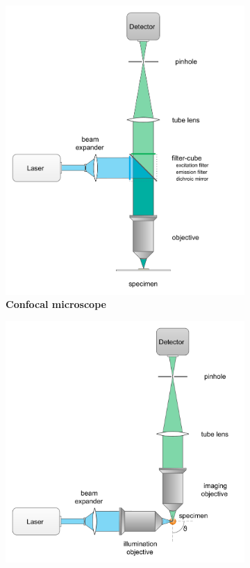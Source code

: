 \documentclass{tdk_style}
\begin{document}
\begin{figure}
\begin{subfigure}[t]{0.49\textwidth}
	\centering
	\includegraphics[width=\textwidth]{figures/1_introduction/confocal}
	\caption{\textbf{Confocal microscope}}
	\label{fig:confocal}
\end{subfigure}
\begin{subfigure}[t]{0.49\textwidth}
	\centering
	\includegraphics[width=\textwidth]{figures/1_introduction/conf-theta}

\end{subfigure}
\end{figure}
\end{document}
